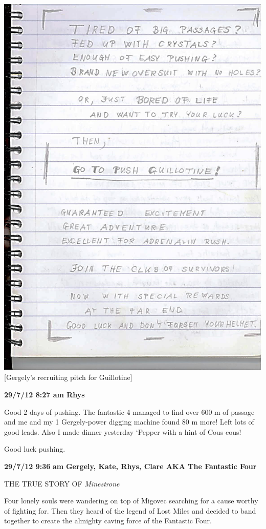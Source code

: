 \includegraphics{UgLog1012/80.jpeg}\\
{[}Gergely's recruiting pitch for Guillotine{]}

\textbf{29/7/12 8:27 am Rhys}

Good 2 days of pushing. The fantastic 4 managed to find over 600 m of
passage and me and my 1 Gergely-power digging machine found 80 m more!
Left lots of good leads. Also I made dinner yesterday `Pepper with a
hint of Cous-cous!

Good luck pushing.

\textbf{29/7/12 9:36} \textbf{am} \textbf{Gergely, Kate, Rhys, Clare AKA
The Fantastic Four}

THE TRUE STORY OF \emph{Minestrone}

Four lonely souls were wandering on top of Migovec searching for a cause
worthy of fighting for. Then they heard of the legend of Lost Miles and
decided to band together to create the almighty caving force of the
Fantastic Four.

